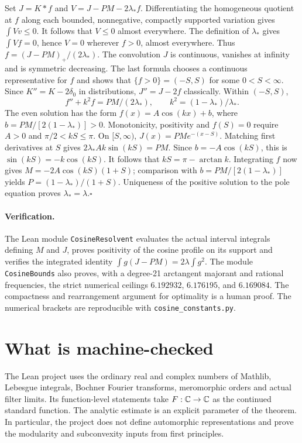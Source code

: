\documentclass[11pt]{article}
\begin{document}
Set $J=K*f$ and $V=J-PM-2\lambda_* f$. Differentiating the
homogeneous quotient at $f$ along each bounded, nonnegative, compactly
supported variation gives $\int Vv\le0$. It follows that $V\le0$
almost everywhere. The definition of $\lambda_*$ gives
$\int Vf=0$, hence $V=0$ wherever $f>0$, almost everywhere. Thus
$f=(J-PM)_+/(2\lambda_*)$. The convolution $J$ is continuous,
vanishes at infinity and is symmetric decreasing. The last formula
chooses a continuous representative for $f$ and shows that
$\{f>0\}=(-S,S)$ for some $0<S<\infty$.
Since $K''=K-2\delta_0$ in distributions, $J''=J-2f$ classically.
Within $(-S,S)$,
\[
 f''+k^2 f=PM/(2\lambda_*),\qquad k^2=(1-\lambda_*)/\lambda_* .
\]
The even solution has the form $f(x)=A\cos(kx)+b$, where
$b=PM/[2(1-\lambda_*)]>0$. Monotonicity, positivity and
$f(S)=0$ require $A>0$ and $\pi/2<kS\le\pi$.
On $[S,\infty)$, $J(x)=PM e^{-(x-S)}$. Matching first
derivatives at $S$ gives $2\lambda_* Ak\sin(kS)=PM$.
Since $b=-A\cos(kS)$, this is $\sin(kS)=-k\cos(kS)$.
It follows that $kS=\pi-\arctan k$. Integrating $f$ now gives
$M=-2A\cos(kS)(1+S)$; comparison with
$b=PM/[2(1-\lambda_*)]$ yields $P=(1-\lambda_*)/(1+S)$.
Uniqueness of the positive solution to the pole equation proves
$\lambda_*=\lambda$.\hfill$\square$

\paragraph{Verification.}
The Lean module \texttt{CosineResolvent} evaluates the actual interval
integrals defining $M$ and $J$, proves positivity of the cosine profile
on its support and verifies the integrated identity
$\int g(J-PM)=2\lambda\int g^2$. The module \texttt{CosineBounds} also proves, with a degree-21 arctangent
majorant and rational frequencies, the strict numerical ceilings
$6.192932$, $6.176195$, and $6.169084$. The compactness and rearrangement
argument for optimality is a human proof. The numerical brackets are
reproducible with \texttt{cosine\_constants.py}.


\section{What is machine-checked}
The Lean project uses the ordinary real and complex numbers of Mathlib, Lebesgue integrals, Bochner Fourier transforms, meromorphic orders and actual filter limits. Its function-level statements take $F:\mathbb C\to\mathbb C$ as the continued standard function. The analytic estimate is an explicit parameter of the theorem. In particular, the project does not define automorphic representations and prove the modularity and subconvexity inputs from first principles.
\end{document}
